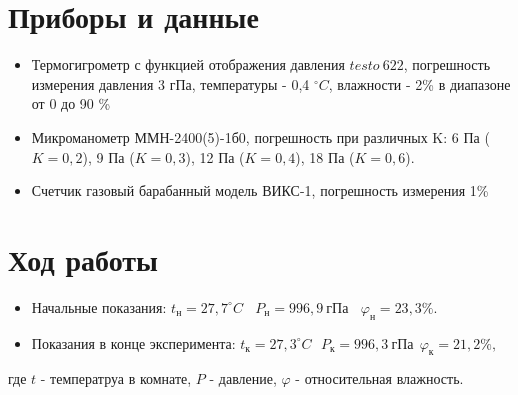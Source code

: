 \documentclass[a4paper,12pt]{article}
\begin{document}
    \section{Приборы и данные}
    \begin{itemize}
        \item Термогигрометр с функцией отображения давления $testo \ 622$, погрешность измерения давления 3 гПа, температуры - 0,4 $^\circ C$, влажности - 2\% в диапазоне от 0 до 90 \%
        \item Микроманометр ММН-2400(5)-1б0, погрешность при различных K: 6 Па ($K = 0,2$), 9 Па ($K = 0,3$), 12 Па ($K = 0,4$), 18 Па ($K = 0,6$).
        \item Счетчик газовый барабанный модель ВИКС-1, погрешность измерения 1\%
    \end{itemize}

    \section{Ход работы}
    \begin{itemize}
        \item Начальные показания:
    $
    	t_\text{н} = 27,7 ^\circ C \ \ \ \  P_\text{н} = 996,9 \ \text{гПа} \ \ \ \  \varphi_\text{н} = 23,3 \%.
    $
        \item Показания в конце эксперимента:
    $
    	t_\text{к} = 27,3 ^\circ C \ \ \  P_\text{к} = 996,3 \ \text{гПа} \ \ \varphi_\text{к} = 21,2 \%,
    $
        \end{itemize}
    
    где $t$ - температруа в комнате, $P$ - давление, $\varphi$ - относительная влажность.\\
\end{document}
